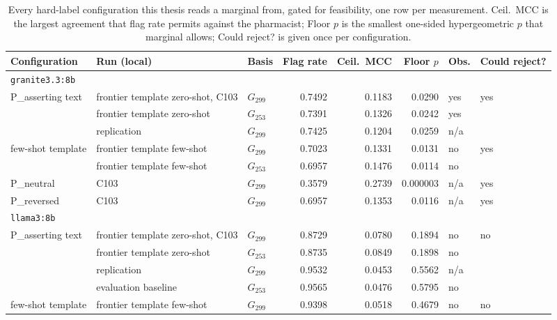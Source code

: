 \begin{table}[H]
\caption[The marginal feasibility gate, all 15 configurations]{Every
hard-label configuration this thesis reads a marginal from, gated for
feasibility, one row per measurement. Ceil.\ MCC is the largest agreement that
flag rate permits against the pharmacist; Floor $p$ is the smallest one-sided
hypergeometric $p$ that marginal allows; Could reject? is given once per
configuration.}
\centering
\scriptsize
\begin{tabular}{lllrrrll}
\toprule
\textbf{Configuration} & \textbf{Run (local)} & \textbf{Basis} & \textbf{Flag rate} & \textbf{Ceil.\ MCC} & \textbf{Floor $p$} & \textbf{Obs.} & \textbf{Could reject?} \\
\midrule
\multicolumn{8}{l}{\texttt{granite3.3:8b}} \\
P\_asserting text & frontier template zero-shot, C103 & $G_{299}$ & 0.7492 & 0.1183 & 0.0290 & yes & yes \\
                  & frontier template zero-shot      & $G_{253}$ & 0.7391 & 0.1326 & 0.0242 & yes & \\
                  & replication             & $G_{299}$ & 0.7425 & 0.1204 & 0.0259 & n/a & \\
few-shot template & frontier template few-shot       & $G_{299}$ & 0.7023 & 0.1331 & 0.0131 & no  & yes \\
                  & frontier template few-shot       & $G_{253}$ & 0.6957 & 0.1476 & 0.0114 & no  & \\
P\_neutral        & C103                    & $G_{299}$ & 0.3579 & 0.2739 & 0.000003 & n/a & yes \\
P\_reversed       & C103                    & $G_{299}$ & 0.6957 & 0.1353 & 0.0116 & n/a & yes \\
\midrule
\multicolumn{8}{l}{\texttt{llama3:8b}} \\
P\_asserting text & frontier template zero-shot, C103 & $G_{299}$ & 0.8729 & 0.0780 & 0.1894 & no  & no \\
                  & frontier template zero-shot      & $G_{253}$ & 0.8735 & 0.0849 & 0.1898 & no  & \\
                  & replication             & $G_{299}$ & 0.9532 & 0.0453 & 0.5562 & n/a & \\
                  & evaluation baseline     & $G_{253}$ & 0.9565 & 0.0476 & 0.5795 & no  & \\
few-shot template & frontier template few-shot       & $G_{299}$ & 0.9398 & 0.0518 & 0.4679 & no  & no \\

\end{tabular}
\end{table}
